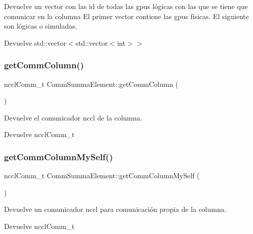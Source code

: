 Devuelve un vector con las id de todas las gpus lógicas con las que se tiene que comunicar en la columna El primer vector contiene las gpus físicas. El siguiente son lógicas o simuladas. 

\begin{DoxyReturn}{Devuelve}
std\+::vector$<$std\+::vector$<$int$>$$>$ 
\end{DoxyReturn}
\mbox{\label{classCommSummaElement_aa253429acb0372db823119d855e81324}} 
\subsubsection{\texorpdfstring{get\+Comm\+Column()}{getCommColumn()}}
{\footnotesize\ttfamily nccl\+Comm\+\_\+t Comm\+Summa\+Element\+::get\+Comm\+Column (\begin{DoxyParamCaption}{ }\end{DoxyParamCaption})}



Devuelve el comunicador nccl de la columna. 

\begin{DoxyReturn}{Devuelve}
nccl\+Comm\+\_\+t 
\end{DoxyReturn}
\mbox{\label{classCommSummaElement_afe3e0bcd32d05461b70f35adbc1f7b83}} 
\subsubsection{\texorpdfstring{get\+Comm\+Column\+My\+Self()}{getCommColumnMySelf()}}
{\footnotesize\ttfamily nccl\+Comm\+\_\+t Comm\+Summa\+Element\+::get\+Comm\+Column\+My\+Self (\begin{DoxyParamCaption}{ }\end{DoxyParamCaption})}



Devuelve un comunicador nccl para comunicación propia de la columna. 

\begin{DoxyReturn}{Devuelve}
nccl\+Comm\+\_\+t 
\end{DoxyReturn}
\mbox{\label{classCommSummaElement_abfc478b14943a693dc3c42ea06d4e947}} 
